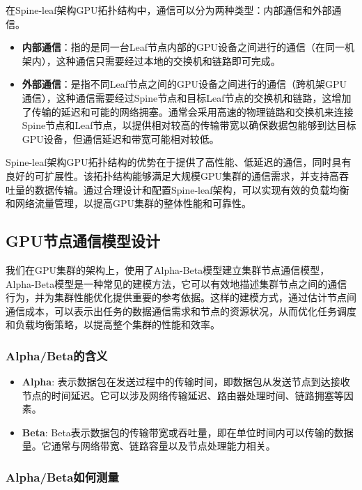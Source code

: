 在Spine-leaf架构GPU拓扑结构中，通信可以分为两种类型：内部通信和外部通信。
\begin{itemize}
    \item \textbf{内部通信}：指的是同一台Leaf节点内部的GPU设备之间进行的通信（在同一机架内），这种通信只需要经过本地的交换机和链路即可完成。
    \item \textbf{外部通信}：是指不同Leaf节点之间的GPU设备之间进行的通信（跨机架GPU通信），这种通信需要经过Spine节点和目标Leaf节点的交换机和链路，这增加了传输的延迟和可能的网络拥塞。通常会采用高速的物理链路和交换机来连接Spine节点和Leaf节点，以提供相对较高的传输带宽以确保数据包能够到达目标GPU设备，但通信延迟和带宽可能相对较低。
\end{itemize} 

Spine-leaf架构GPU拓扑结构的优势在于提供了高性能、低延迟的通信，同时具有良好的可扩展性。该拓扑结构能够满足大规模GPU集群的通信需求，并支持高吞吐量的数据传输。通过合理设计和配置Spine-leaf架构，可以实现有效的负载均衡和网络流量管理，以提高GPU集群的整体性能和可靠性。

\subsection{GPU节点通信模型设计}

我们在GPU集群的架构上，使用了Alpha-Beta模型建立集群节点通信模型，Alpha-Beta模型是一种常见的建模方法，它可以有效地描述集群节点之间的通信行为，并为集群性能优化提供重要的参考依据。这样的建模方式，通过估计节点间通信成本，可以表示出任务的数据通信需求和节点的资源状况，从而优化任务调度和负载均衡策略，以提高整个集群的性能和效率。

\subsubsection{Alpha/Beta的含义}

\begin{itemize}
    \item \textbf{Alpha}: 表示数据包在发送过程中的传输时间，即数据包从发送节点到达接收节点的时间延迟。它可以涉及网络传输延迟、路由器处理时间、链路拥塞等因素。
    \item \textbf{Beta}: Beta表示数据包的传输带宽或吞吐量，即在单位时间内可以传输的数据量。它通常与网络带宽、链路容量以及节点处理能力相关。
\end{itemize}

\subsubsection{Alpha/Beta如何测量}


